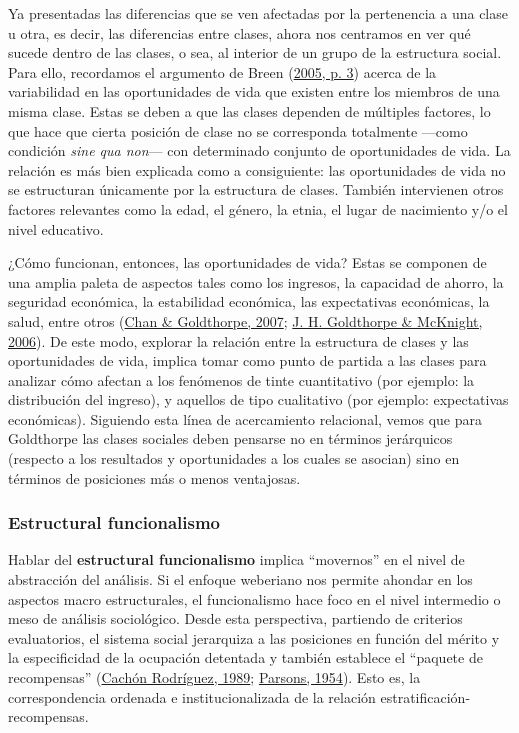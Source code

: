 \documentclass[
]{article}
\begin{document}
Ya presentadas las diferencias que se ven afectadas por la pertenencia a una clase u otra, es decir, las diferencias entre clases, ahora nos centramos en ver qué sucede dentro de las clases, o sea, al interior de un grupo de la estructura social. Para ello, recordamos el argumento de Breen (\protect\hyperlink{ref-Breen2005}{2005, p. 3}) acerca de la variabilidad en las oportunidades de vida que existen entre los miembros de una misma clase. Estas se deben a que las clases dependen de múltiples factores, lo que hace que cierta posición de clase no se corresponda totalmente ---como condición \emph{sine qua non}--- con determinado conjunto de oportunidades de vida. La relación es más bien explicada como a consiguiente: las oportunidades de vida no se estructuran únicamente por la estructura de clases. También intervienen otros factores relevantes como la edad, el género, la etnia, el lugar de nacimiento y/o el nivel educativo.

¿Cómo funcionan, entonces, las oportunidades de vida? Estas se componen de una amplia paleta de aspectos tales como los ingresos, la capacidad de ahorro, la seguridad económica, la estabilidad económica, las expectativas económicas, la salud, entre otros (\protect\hyperlink{ref-Chan.Goldthorpe2007}{Chan \& Goldthorpe, 2007}; \protect\hyperlink{ref-Goldthorpe.McKnight2006}{J. H. Goldthorpe \& McKnight, 2006}). De este modo, explorar la relación entre la estructura de clases y las oportunidades de vida, implica tomar como punto de partida a las clases para analizar cómo afectan a los fenómenos de tinte cuantitativo (por ejemplo: la distribución del ingreso), y aquellos de tipo cualitativo (por ejemplo: expectativas económicas). Siguiendo esta línea de acercamiento relacional, vemos que para Goldthorpe las clases sociales deben pensarse no en términos jerárquicos (respecto a los resultados y oportunidades a los cuales se asocian) sino en términos de posiciones más o menos ventajosas.

\hypertarget{estructural-funcionalismo}{%
\subsubsection{Estructural funcionalismo}\label{estructural-funcionalismo}}

Hablar del \textbf{estructural funcionalismo} implica ``movernos'' en el nivel de abstracción del análisis. Si el enfoque weberiano nos permite ahondar en los aspectos macro estructurales, el funcionalismo hace foco en el nivel intermedio o meso de análisis sociológico. Desde esta perspectiva, partiendo de criterios evaluatorios, el sistema social jerarquiza a las posiciones en función del mérito y la especificidad de la ocupación detentada y también establece el ``paquete de recompensas'' (\protect\hyperlink{ref-CachonRodriguez1989}{Cachón Rodríguez, 1989}; \protect\hyperlink{ref-Parsons1954}{Parsons, 1954}). Esto es, la correspondencia ordenada e institucionalizada de la relación estratificación-recompensas.
\end{document}

